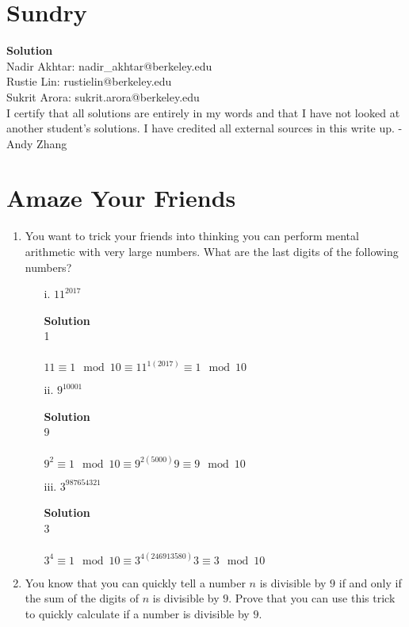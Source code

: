 \documentclass[11pt]{article}
\newcommand*{\Question}[1]{\section{#1}}
\newenvironment{Parts}{\begin{enumerate}[label=(\alph*)]}{\end{enumerate}}
\newcommand*{\Part}{\item}
\newenvironment{Answer}{\vspace{10pt}\begin{mdframed}\textbf{Solution}\\}{\end{mdframed}\vfill\pagebreak[3]}
\newenvironment{Answer}{\vspace{10pt}}{\vfill\pagebreak[3]}
\begin{document}
\Question{Sundry} 
\begin{Answer}

\noindent Nadir Akhtar: nadir\_akhtar@berkeley.edu\\
Rustie Lin: rustielin@berkeley.edu\\
Sukrit Arora: sukrit.arora@berkeley.edu\\

I certify that all solutions are entirely in my words and that I have not looked at another student’s
solutions. I have credited all external sources in this write up. - Andy Zhang

\end{Answer}

\Question{Amaze Your Friends}
\begin{Parts}
	
	\Part You want to trick your friends into thinking you can perform mental arithmetic with very large numbers.
	What are the last digits of the following numbers?
	
	\begin{enumerate}
		
		\item[i.] \quad $11^{2017}$
		      \begin{Answer}
		      1
		      \\
		      \\
		      $11 \equiv 1 \mod 10 \equiv 11^{1(2017)} \equiv 1 \mod 10$
		      \end{Answer}
		\item[ii.] \quad $9^{10001}$
		      \begin{Answer}
		      9
		      \\
		      \\
		      $9^2 \equiv 1 \mod 10 \equiv 9^{2(5000)}9 \equiv 9 \mod 10$
		      \end{Answer}
		\item[iii.] \quad $3^{987654321}$
		      \begin{Answer}
		      3
		      \\
		      \\
		      $3^4 \equiv 1 \mod 10 \equiv 3^{4(246913580)}3 \equiv 3 \mod 10$
		      \end{Answer}
	\end{enumerate}
	
	\Part You know that you can quickly tell a number $n$ is divisible by $9$ if and only if the sum of the digits of $n$ is divisible by $9$. Prove that you can use this trick to quickly calculate if a number is divisible by $9$.
	

\end{Parts}
\end{document}
